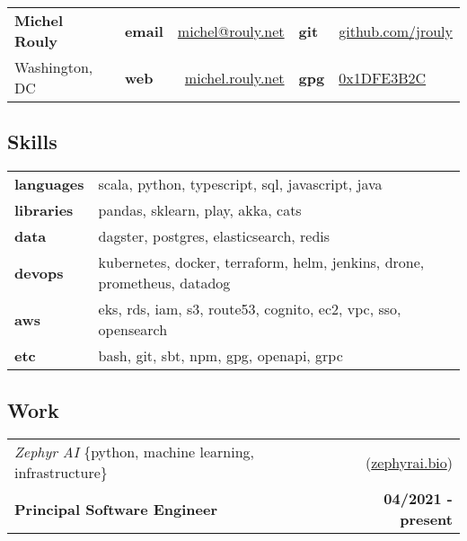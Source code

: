 \documentclass[10pt,letterpaper]{article}
\begin{document}
\setcounter{secnumdepth}{0}

\noindent
\begin{tabularx}{\textwidth}{@{} l X lr lX @{}}
  {\Large\textbf{Michel Rouly}} & &
      \textbf{email} & \href{mailto:michel@rouly.net}{michel@rouly.net} &
      \textbf{git} & \href{https://github.com/jrouly}{github.com/jrouly} \\
  {Washington, DC} & &
      \textbf{web} & \href{https://michel.rouly.net}{michel.rouly.net} &
      \textbf{gpg} & \href{https://keyserver.ubuntu.com/pks/lookup?search=0x1DFE3B2C\&fingerprint=on\&op=index}{0x1DFE3B2C} \\
\end{tabularx}

\subsection{Skills}

\noindent
\begin{tabularx}{\textwidth}{@{} lX @{}}
  \textbf{languages} & scala, python, typescript, sql, javascript, java \\
  \textbf{libraries} & pandas, sklearn, play, akka, cats \\
  \textbf{data} & dagster, postgres, elasticsearch, redis \\
  \textbf{devops} & kubernetes, docker, terraform, helm, jenkins, drone, prometheus, datadog \\
  \textbf{aws} & eks, rds, iam, s3, route53, cognito, ec2, vpc, sso, opensearch \\
  \textbf{etc} & bash, git, sbt, npm, gpg, openapi, grpc
\end{tabularx}

\subsection{Work}

\noindent\begin{tabularx}{\textwidth}{@{} Xr @{}}
  \textit{Zephyr AI} \{python, machine learning, infrastructure\} & (\href{https://zephyrai.bio}{zephyrai.bio}) \\
  \textbf{Principal Software Engineer} & \textbf{04/2021 - present} \\
\end{tabularx}
\end{document}

